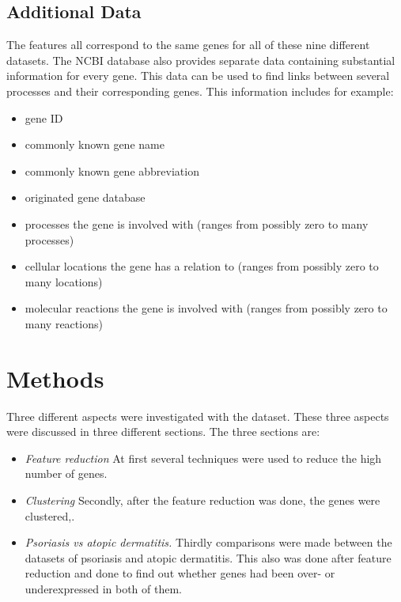 \documentclass[10pt,a4paper]{report}
\begin{document}
	\subsection{Additional Data}
	\label{subsec:AdditionalData}
	
	The features all correspond to the same genes for all of these nine different datasets. The NCBI database\cite{edgar2002gene} also provides separate data containing substantial information for every gene. This data can be used to find links between several processes and their corresponding genes. This information includes for example:
	
	\begin{itemize}
		\item gene ID
		\item commonly known gene name
		\item commonly known gene abbreviation
		\item originated gene database
		\item processes the gene is involved with (ranges from possibly zero to many processes)
		\item cellular locations the gene has a relation to (ranges from possibly zero to many locations)
		\item molecular reactions the gene is involved with (ranges from possibly zero to many reactions)
	\end{itemize}
	
	\section{Methods}
	\label{sec:Methods}
	
	Three different aspects were investigated with the dataset. These three aspects were discussed in three different sections. The three sections are:
	\begin{itemize}
		\item  \textit{Feature reduction} At first several techniques were used to reduce the high number of genes.
		\item  \textit{Clustering}	Secondly, after the feature reduction was done, the genes were clustered,.
		\item	\textit{Psoriasis vs atopic dermatitis.} Thirdly comparisons were made between the datasets of psoriasis and atopic dermatitis. This also was done after feature reduction and done to find out whether genes had been over- or underexpressed in both of them.
	\end{itemize} 
	
\end{document}
